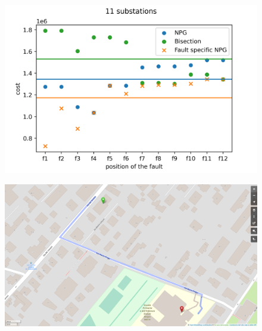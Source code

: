\documentclass[10pt, aspectratio=169, compress, protectframetitle, handout]{beamer}
\begin{document}
\begin{frame}[noframenumbering]{}

    \begin{figure}
        \centering
        \includegraphics[scale=0.85]{figures/scatterplot.png}
    \end{figure}
    
\end{frame}

\begin{frame}[noframenumbering]{}

    \vspace*{-10pt}
    \begin{figure}
        \centering
        \hspace*{-13pt}
        \includegraphics[scale=0.36]{figures/Distanza 7998556-7998442 v2}
    \end{figure}
    
\end{frame}
\end{document}

